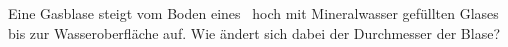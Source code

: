 Eine Gasblase steigt vom Boden eines \hglO\ hoch mit Mineralwasser gefüllten Glases bis zur Wasseroberfläche auf. Wie ändert sich dabei der Durchmesser der Blase?
